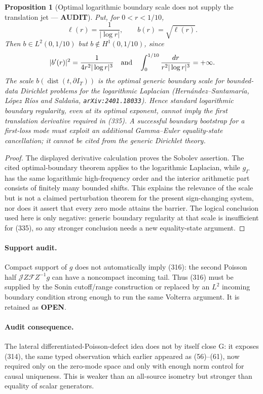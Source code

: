 \documentclass[11pt]{article}
\newtheorem{proposition}[theorem]{Proposition}
\newcommand{\OPEN}{\textcolor{red!70!black}{\textbf{OPEN}}}
\newcommand{\AUDIT}{\textcolor{orange!75!black}{\textbf{AUDIT}}}
\begin{document}
\begin{proposition}[Optimal logarithmic boundary scale does not supply the
translation jet --- \AUDIT]
Put, for $0<r<1/10$,
\begin{equation}
 \ell(r)=\frac1{|\log r|},
 \qquad b(r)=\sqrt{\ell(r)}.                         \tag{418}
\end{equation}
Then $b\in L^2(0,1/10)$ but $b\notin H^1(0,1/10)$, since
\[
 |b'(r)|^2=\frac1{4r^2|\log r|^3}
 \quad\hbox{and}\quad
 \int_0^{1/10}\frac{dr}{r^2|\log r|^3}=+\infty.
\]
The scale $b(\operatorname{dist}(t,\partial I_T))$ is the optimal generic
boundary scale for bounded-data Dirichlet problems for the logarithmic
Laplacian (Hern\'andez--Santamar\'ia, L\'opez R\'ios and Salda\~na,
\texttt{arXiv:2401.18033}).  Hence standard logarithmic boundary
regularity, even at its optimal exponent, cannot imply the first
translation derivative required in (335).  A successful boundary bootstrap
for a first-loss mode must exploit an additional Gamma--Euler equality-state
cancellation; it cannot be cited from the generic Dirichlet theory.
\end{proposition}

\begin{proof}
The displayed derivative calculation proves the Sobolev assertion.  The
cited optimal-boundary theorem applies to the logarithmic Laplacian, while
$g_\Gamma$ has the same logarithmic high-frequency order and the interior
arithmetic part consists of finitely many bounded shifts.  This explains the
relevance of the scale but is not a claimed perturbation theorem for the
present sign-changing system, nor does it assert that every zero mode
attains the barrier.  The logical
conclusion used here is only negative: generic boundary regularity at that
scale is insufficient for (335), so any stronger conclusion needs a new
equality-state argument.
\end{proof}

\paragraph{Support audit.}
Compact support of $g$ does not automatically imply (316): the second
Poisson half $\mathscr JZ\mathcal FZ^{-1}g$ can have a noncompact incoming
tail.  Thus (316) must be supplied by the Sonin cutoff/range construction or
replaced by an $L^2$ incoming boundary condition strong enough to run the
same Volterra argument.  It is retained as \OPEN{}.

\paragraph{Audit consequence.}
The lateral differentiated-Poisson-defect idea does not by itself close G:
it exposes (314), the same typed observation which earlier appeared as
(56)--(61), now required only on the zero-mode space and only with enough
norm control for causal uniqueness.  This is weaker than an all-source
isometry but stronger than equality of scalar generators.
\end{document}

